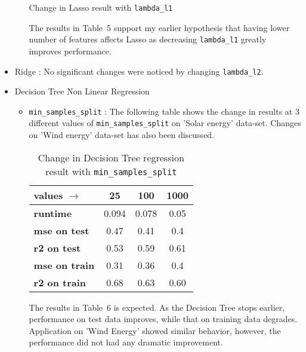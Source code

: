 \documentclass[12pt]{article}
\begin{document}
\begin{itemize}
\begin{itemize}
\begin{table}[!hptb]
\caption{Change in Lasso result with \texttt{lambda\_l1}}
\end{table}
The results in Table~5 support my earlier hypothesis that having lower number of features affects Lasso as decreasing \texttt{lambda\_l1} greatly improves performance.
\end{itemize}
\item Ridge : No significant changes were noticed by changing \texttt{lambda\_l2}.
\item Decision Tree Non Linear Regression
\begin{itemize}
\item \texttt{min\_samples\_split}  : The following table shows the change in results at 3 different values of \texttt{min\_samples\_split}  on 'Solar energy' data-set. Changes on 'Wind energy' data-set has also been discussed.
\begin{table}[!hptb]
\centering
\begin{tabular}{|l|c|c|c|}
\hline
\textbf{values $\to$} & \textbf{25} & \textbf{100} & \textbf{1000}  \\\hline
\textbf{runtime} &  0.094 & 0.078 & 0.05 \\
\textbf{mse on test} & 0.47 & 0.41 & 0.4 \\
\textbf{r2 on test} & 0.53 & 0.59 & 0.61 \\
\textbf{mse on train} & 0.31 & 0.36 & 0.4 \\
\textbf{r2 on train} & 0.68 & 0.63 & 0.60 \\\hline
\end{tabular}
\caption{Change in Decision Tree regression result with \texttt{min\_samples\_split}}
\end{table}
The results in Table~6 is expected. As the Decision Tree stops earlier, performance on test data improves, while that on training data degrades. Application on 'Wind Energy' showed similar behavior, however, the performance did not had any dramatic improvement.
\end{itemize}
\end{itemize}
\end{document}

